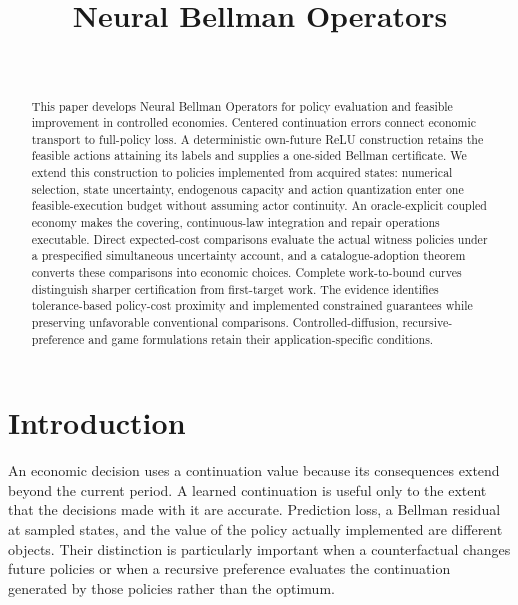 \documentclass[ecta,nameyear,draft]{econsocart}
\begin{document}
\begin{frontmatter}
\title{Neural Bellman Operators}
\begin{aug}
\author[id=au1,addressref={add1}]{~}
\address[id=add1]{Peking University}
\end{aug}
\begin{abstract}
This paper develops Neural Bellman Operators for policy evaluation and feasible improvement in controlled economies. Centered continuation errors connect economic transport to full-policy loss. A deterministic own-future ReLU construction retains the feasible actions attaining its labels and supplies a one-sided Bellman certificate. We extend this construction to policies implemented from acquired states: numerical selection, state uncertainty, endogenous capacity and action quantization enter one feasible-execution budget without assuming actor continuity. An oracle-explicit coupled economy makes the covering, continuous-law integration and repair operations executable. Direct expected-cost comparisons evaluate the actual witness policies under a prespecified simultaneous uncertainty account, and a catalogue-adoption theorem converts these comparisons into economic choices. Complete work-to-bound curves distinguish sharper certification from first-target work. The evidence identifies tolerance-based policy-cost proximity and implemented constrained guarantees while preserving unfavorable conventional comparisons. Controlled-diffusion, recursive-preference and game formulations retain their application-specific conditions.
\end{abstract}
\begin{keyword}
\end{keyword}
\end{frontmatter}

\section{Introduction}\label{sec:introduction}
An economic decision uses a continuation value because its consequences extend beyond the current period. A learned continuation is useful only to the extent that the decisions made with it are accurate. Prediction loss, a Bellman residual at sampled states, and the value of the policy actually implemented are different objects. Their distinction is particularly important when a counterfactual changes future policies or when a recursive preference evaluates the continuation generated by those policies rather than the optimum.
\end{document}
